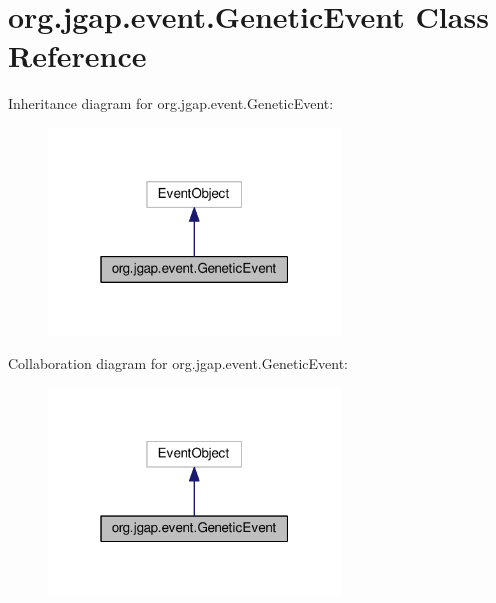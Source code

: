 \hypertarget{classorg_1_1jgap_1_1event_1_1_genetic_event}{\section{org.\-jgap.\-event.\-Genetic\-Event Class Reference}
\label{classorg_1_1jgap_1_1event_1_1_genetic_event}
}


Inheritance diagram for org.\-jgap.\-event.\-Genetic\-Event\-:
\nopagebreak
\begin{figure}[H]
\begin{center}
\leavevmode
\includegraphics[width=220pt]{classorg_1_1jgap_1_1event_1_1_genetic_event__inherit__graph}
\end{center}
\end{figure}


Collaboration diagram for org.\-jgap.\-event.\-Genetic\-Event\-:
\nopagebreak
\begin{figure}[H]
\begin{center}
\leavevmode
\includegraphics[width=220pt]{classorg_1_1jgap_1_1event_1_1_genetic_event__coll__graph}
\end{center}
\end{figure}
